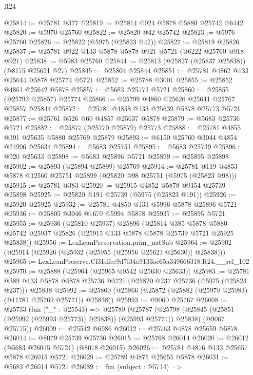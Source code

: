 \begin{lexlean}{R24}
\begin{coremodule}
@25814 := @25781 @377
@25819 := @25814 @924 @5878 @5880 @25742 @6442
@25820 := @5970 @25760
@25822 := @25820 @42 @25742
@25823 := @5976 @25760
@25826 := @25822 (@5975 (@25823 @42))
@25827 := @25819 @25826
@25837 := @25781 @922 @133 @5878 @5878 @921 @5721 (@6222 @25760 @918 @921)
@25838 := @5983 @25760
@25844 := @25813 (@25827 (@25837 @25838)) (@8175 @25621 @27)
@25845 := @25804 @25844
@25851 := @25781 @4862 @133 @25644 @5878 @25774 @5721
@25852 := @25788 @3001
@25855 := @25852 @4861 @25642 @5878
@25857 := @5683 @25773 @5721
@25860 := @25855 (@25793 @25857) @25774
@25866 := @25799 @4860 @25626 @25641 @25767 @25857 @25844
@25872 := @25781 @4858 @133 @25639 @5878 @25773 @5721
@25877 := @25761 @526 @60 @4857 @25637 @5878
@25879 := @5683 @25736 @5721
@25882 := @25877 (@25770 @25879) @25773
@25888 := @25781 @4855 @391 @25635 @5880 @25769 @25879
@25893 := @6150 @25760 @3044 @4854 @24996 @25634
@25894 := @5683 @25751
@25895 := @5683 @25739
@25896 := @920 @25633
@25898 := @5683 @25896 @5721
@25899 := @25895 @25898
@25902 := @25893 (@25894 @25899) @25769
@25914 := @25781 @119 @4853 @5878 @12560 @25751 @25899 (@25820 @98 @25751 (@5975 (@25823 @98)))
@25915 := @25781 @383
@25920 := @25915 @4852 @5878 @9154 @25739 @25898
@25925 := @25820 @191 @25739 (@5975 (@25823 @191))
@25926 := @25920 @25925
@25932 := @25781 @4850 @133 @5996 @5878 @25896 @5721
@25936 := @25805 @3046 @1670 @5994 @5878
@25937 := @25895 @5721
@25955 := @25936
    (@25810 @25937)
    @25896
    (@25814
      @385
      @5878
      @5880
      @25742
      @25937
      @25826
      (@25915 @133 @5878 @5878 @25739 @5721 @25925 @25838))
@25956 := LexLeanPreservation.prim_natSub
@25964 := @25902 (@25914 (@25926 (@25932 (@25955 (@25956 @25621 @25630)) @25838)))
@25965 := LexLeanPreserve.Cf31dfec9d7f34a9133ae65a349666318.R24.__rel_102
@25970 := @25888 (@25964 (@25965 @9542 @25630 @25633))
@25983 := @25781
    @389
    @133
    @5878
    @5878
    @25736
    @5721
    (@25820 @237 @25736 (@5975 (@25823 @237)))
    @25838
@25992 := @25860 (@25866 (@25872 (@25882 (@25970 @25983) (@11781 @25769 @25771)) @25838))
@25993 := @9060 @25767
@26008 := @25733
    (fun ("_" : @25543) =>
    @25780
      (@25787 (@25798 (@25845 (@25851 (@25992 (@25993 @25773)) @25838)) (@25993 @25774)) @25838)
      (@9067 @25775))
@26009 := @25542 @6986
@26012 := @25763 @4878 @25659 @5878
@26014 := @8079 @25739 @25736
@26015 := @25768 @26014
@26020 := @26012 (@5683 @26015 @5721) (@8078 @26015)
@26026 := @25781 @4876 @133 @25657 @5878 @26015 @5721
@26029 := @25789 @4875 @25655 @5878
@26031 := @5683 @26014 @5721
@26089 := fun (subject : @5714) =>

\end{coremodule}
\end{lexlean}
